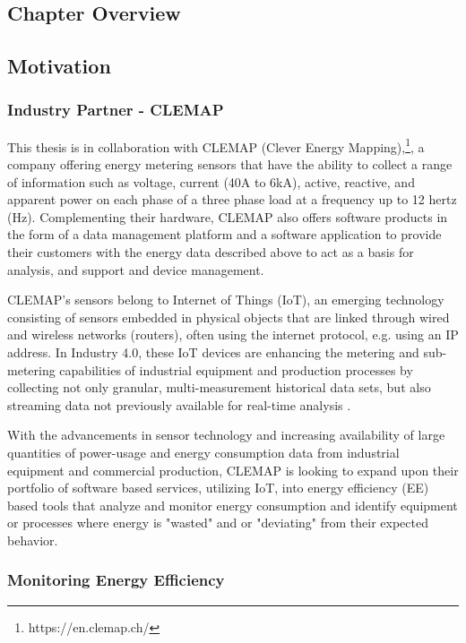 \subsection{Chapter Overview}

\subsection{Motivation}

\subsubsection{Industry Partner - CLEMAP}
This thesis is in collaboration with CLEMAP (Clever Energy Mapping),\footnote[1]{https://en.clemap.ch/}, a company offering energy metering sensors that have the ability to collect a range of information such as voltage, current (40A to 6kA), active, reactive, and apparent power on each phase of a three phase load at a frequency up to 12 hertz (Hz). Complementing their hardware, CLEMAP also offers software products in the form of a data management platform and a software application to provide their customers with the energy data described above to act as a basis for analysis, and support and device management.

CLEMAP’s sensors belong to Internet of Things (IoT), an emerging technology consisting of sensors embedded in physical objects that are linked through wired and wireless networks (routers), often using the internet protocol, e.g. using an IP address. In Industry 4.0, these IoT devices are enhancing the metering and sub-metering capabilities of industrial equipment and production processes by collecting not only granular, multi-measurement historical data sets, but also streaming data not previously available for real-time analysis \cite{iot-1}.

With the advancements in sensor technology and increasing availability of large quantities of power-usage and energy consumption data from industrial equipment and commercial production, CLEMAP is looking to expand upon their portfolio of software based services, utilizing IoT, into energy efficiency (EE) based tools that analyze and monitor energy consumption and identify equipment or processes where energy is "wasted" and or "deviating" from their expected behavior.

\subsubsection{Monitoring Energy Efficiency}

